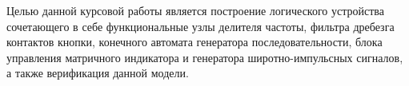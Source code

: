 \Introduction



Целью данной курсовой работы является построение логического устройства сочетающего в себе функциональные узлы делителя частоты, фильтра дребезга контактов кнопки, конечного автомата генератора последовательности, блока управления матричного индикатора и генератора широтно-импульсных сигналов, а также верификация данной модели.




%
